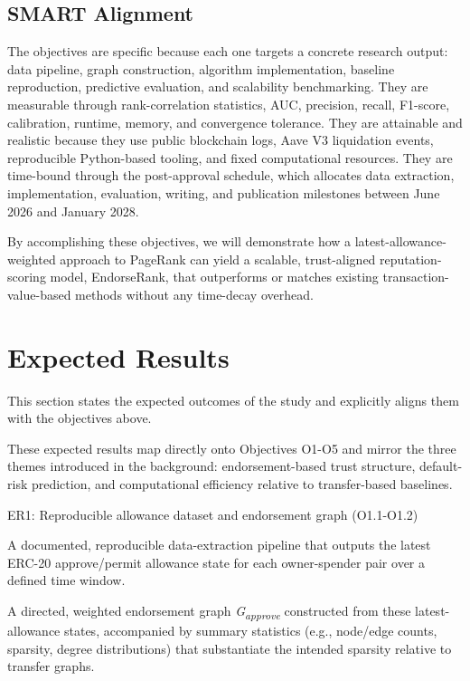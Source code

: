\documentclass[
]{article}
\begin{document}
\subsection{SMART Alignment}\label{smart-alignment}

The objectives are specific because each one targets a concrete research output: data pipeline, graph construction, algorithm implementation, baseline reproduction, predictive evaluation, and scalability benchmarking. They are measurable through rank-correlation statistics, AUC, precision, recall, F1-score, calibration, runtime, memory, and convergence tolerance. They are attainable and realistic because they use public blockchain logs, Aave V3 liquidation events, reproducible Python-based tooling, and fixed computational resources. They are time-bound through the post-approval schedule, which allocates data extraction, implementation, evaluation, writing, and publication milestones between June 2026 and January 2028.

By accomplishing these objectives, we will demonstrate how a latest-allowance-weighted approach to PageRank can yield a scalable, trust-aligned reputation-scoring model, EndorseRank, that outperforms or matches existing transaction-value-based methods without any time-decay overhead.

\section{Expected Results}\label{expected-results}

This section states the expected outcomes of the study and explicitly aligns them with the objectives above.

These expected results map directly onto Objectives O1-O5 and mirror the three themes introduced in the background: endorsement-based trust structure, default-risk prediction, and computational efficiency relative to transfer-based baselines.

ER1: Reproducible allowance dataset and endorsement graph (O1.1-O1.2)

A documented, reproducible data-extraction pipeline that outputs the latest ERC-20 approve/permit allowance state for each owner-spender pair over a defined time window.

A directed, weighted endorsement graph \emph{G\textsubscript{approve}} constructed from these latest-allowance states, accompanied by summary statistics (e.g., node/edge counts, sparsity, degree distributions) that substantiate the intended sparsity relative to transfer graphs.
\end{document}

